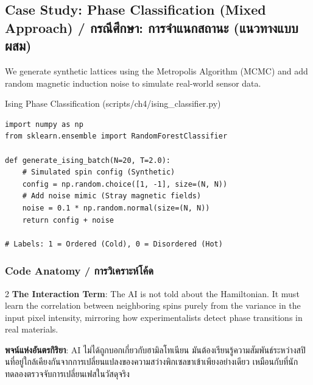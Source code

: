 \subsection{Case Study: Phase Classification (Mixed Approach) \quad / \quad \textthai{กรณีศึกษา: การจำแนกสถานะ (แนวทางแบบผสม)}}
We generate synthetic lattices using the Metropolis Algorithm (MCMC) and add random magnetic induction noise to simulate real-world sensor data.

\begin{pythonbox}{Ising Phase Classification (scripts/ch4/ising\_classifier.py)}
\begin{lstlisting}
import numpy as np
from sklearn.ensemble import RandomForestClassifier

def generate_ising_batch(N=20, T=2.0):
    # Simulated spin config (Synthetic)
    config = np.random.choice([1, -1], size=(N, N))
    # Add noise mimic (Stray magnetic fields)
    noise = 0.1 * np.random.normal(size=(N, N))
    return config + noise

# Labels: 1 = Ordered (Cold), 0 = Disordered (Hot)
\end{lstlisting}
\end{pythonbox}

\subsubsection*{Code Anatomy \quad / \quad \textthai{การวิเคราะห์โค้ด}}
\begin{paracol}{2}
\textbf{The Interaction Term}: The AI is not told about the Hamiltonian. It must learn the correlation between neighboring spins purely from the variance in the input pixel intensity, mirroring how experimentalists detect phase transitions in real materials.

\switchcolumn

\begin{thai}
\textbf{พจน์แห่งอันตรกิริยา}: AI ไม่ได้ถูกบอกเกี่ยวกับฮามิลโทเนียน มันต้องเรียนรู้ความสัมพันธ์ระหว่างสปินที่อยู่ใกล้เคียงกันจากการเปลี่ยนแปลงของความสว่างพิกเซลขาเข้าเพียงอย่างเดียว เหมือนกับที่นักทดลองตรวจจับการเปลี่ยนเฟสในวัสดุจริง
\end{thai}
\end{paracol}

